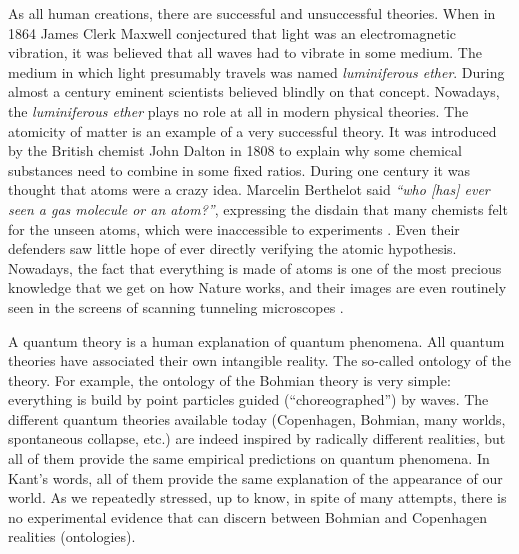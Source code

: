 \documentclass[nofootinbib, secnumarabic, amsmath, nobibnotes,10pt,aps,pra]{revtex4-1}
\begin{document}
As all human creations, there are successful and unsuccessful theories. When in 1864 James Clerk Maxwell conjectured that light was an electromagnetic vibration, it was believed that all waves had to vibrate in some medium. The medium in which light presumably travels was named  \emph{luminiferous ether}. During almost a century eminent scientists believed blindly on that concept. Nowadays, the \emph{luminiferous ether} plays no role at all in modern physical theories\cite{om.herbert}. The atomicity of matter is an example of a very successful theory. It was introduced by the British chemist John Dalton in 1808 to explain why some chemical substances need to combine in some fixed ratios. During one century it was thought that atoms were a crazy idea. Marcelin Berthelot said \emph{``who [has] ever seen a gas molecule  or an atom?''}, expressing the disdain that many chemists felt for the unseen atoms, which were inaccessible to experiments \cite{om.herbert}. Even their defenders saw little hope of ever directly verifying the atomic hypothesis. Nowadays, the fact that everything is made of atoms is one of the most precious knowledge that we get on how Nature works\cite{feynmann}, and their images  are even routinely seen in the screens of scanning tunneling microscopes \cite{binning}. 

A quantum theory is a human explanation of quantum phenomena. All quantum theories have associated their own intangible reality. The so-called ontology of the theory.  For example, the ontology of the Bohmian theory is very simple: everything is build by point particles guided (``choreographed'') by waves.  The different quantum theories available today (Copenhagen, Bohmian, many worlds, spontaneous collapse, etc.) are indeed inspired by radically different realities, but all of them provide the same empirical predictions on quantum phenomena. In Kant's words, all of them provide the same explanation of the appearance of our world. As we repeatedly stressed, up to know, in spite of many attempts, there is no experimental evidence that can discern between Bohmian and Copenhagen realities (ontologies).
\end{document}
